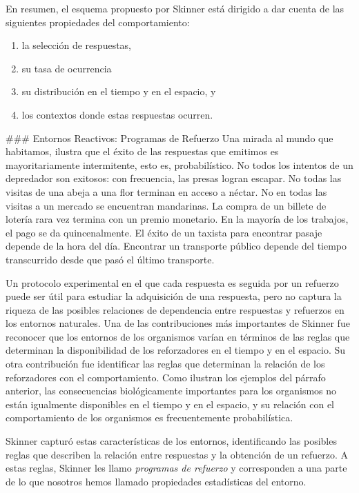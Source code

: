 \documentclass[
  letterpaper,
]{book}
\providecommand{\tightlist}{%
  \setlength{\itemsep}{0pt}\setlength{\parskip}{0pt}}\usepackage{longtable,booktabs,array}
\begin{document}
En resumen, el esquema propuesto por Skinner está dirigido a dar cuenta
de las siguientes propiedades del comportamiento:

\begin{enumerate}
\def\labelenumi{\arabic{enumi}.}
\tightlist
\item
  la selección de respuestas,
\item
  su tasa de ocurrencia
\item
  su distribución en el tiempo y en el espacio, y
\item
  los contextos donde estas respuestas ocurren.
\end{enumerate}

\#\#\# Entornos Reactivos: Programas de Refuerzo Una mirada al mundo que
habitamos, ilustra que el éxito de las respuestas que emitimos es
mayoritariamente intermitente, esto es, probabilístico. No todos los
intentos de un depredador son exitosos: con frecuencia, las presas
logran escapar. No todas las visitas de una abeja a una flor terminan en
acceso a néctar. No en todas las visitas a un mercado se encuentran
mandarinas. La compra de un billete de lotería rara vez termina con un
premio monetario. En la mayoría de los trabajos, el pago se da
quincenalmente. El éxito de un taxista para encontrar pasaje depende de
la hora del día. Encontrar un transporte público depende del tiempo
transcurrido desde que pasó el último transporte.

Un protocolo experimental en el que cada respuesta es seguida por un
refuerzo puede ser útil para estudiar la adquisición de una respuesta,
pero no captura la riqueza de las posibles relaciones de dependencia
entre respuestas y refuerzos en los entornos naturales. Una de las
contribuciones más importantes de Skinner fue reconocer que los entornos
de los organismos varían en términos de las reglas que determinan la
disponibilidad de los reforzadores en el tiempo y en el espacio. Su otra
contribución fue identificar las reglas que determinan la relación de
los reforzadores con el comportamiento. Como ilustran los ejemplos del
párrafo anterior, las consecuencias biológicamente importantes para los
organismos no están igualmente disponibles en el tiempo y en el espacio,
y su relación con el comportamiento de los organismos es frecuentemente
probabilística.

Skinner capturó estas características de los entornos, identificando las
posibles reglas que describen la relación entre respuestas y la
obtención de un refuerzo. A estas reglas, Skinner les llamo
\emph{programas de refuerzo} y corresponden a una parte de lo que
nosotros hemos llamado propiedades estadísticas del entorno.
\end{document}
